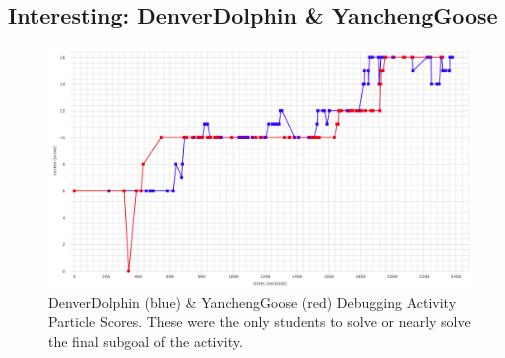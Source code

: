\subsection{Interesting: DenverDolphin \& YanchengGoose}
\begin{figure}
	\centering
	\includegraphics[width=\textwidth]{images/stories/scores-debug-dolphin-goose}
	\caption[DenverDolphin \& YanchengGoose Debugging Activity Particle Scores]{DenverDolphin (blue) \& YanchengGoose (red) Debugging Activity Particle Scores. These were the only students to solve or nearly solve the final subgoal of the activity.}
	\label{fig:dolphin_goose_chart}
\end{figure}
